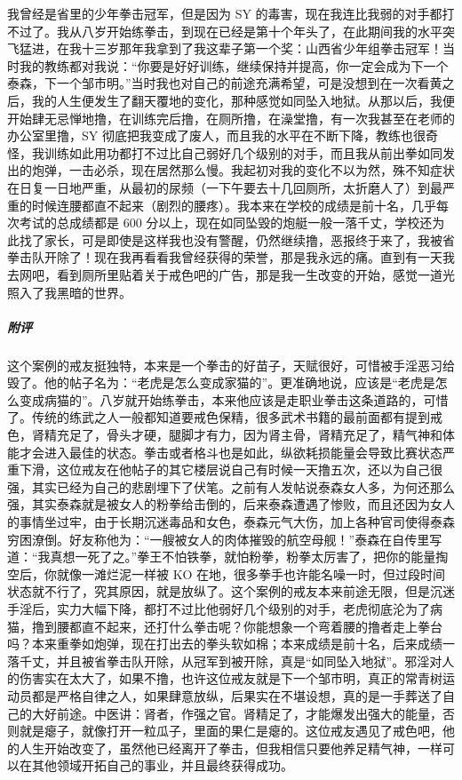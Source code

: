 \begin{case}
    我曾经是省里的少年拳击冠军，但是因为 SY 的毒害，现在我连比我弱的对手都打不过了。我从八岁开始练拳击，到现在已经是第十个年头了，在此期间我的水平突飞猛进，在我十三岁那年我拿到了我这辈子第一个奖：山西省少年组拳击冠军！当时我的教练都对我说：“你要是好好训练，继续保持并提高，你一定会成为下一个泰森，下一个邹市明。”当时我也对自己的前途充满希望，可是没想到在一次看黄之后，我的人生便发生了翻天覆地的变化，那种感觉如同坠入地狱。从那以后，我便开始肆无忌惮地撸，在训练完后撸，在厕所撸，在澡堂撸，有一次我甚至在老师的办公室里撸，SY 彻底把我变成了废人，而且我的水平在不断下降，教练也很奇怪，我训练如此用功都打不过比自己弱好几个级别的对手，而且我从前出拳如同发出的炮弹，一击必杀，现在居然那么慢。我起初对我的变化不以为然，殊不知症状在日复一日地严重，从最初的尿频（一下午要去十几回厕所，太折磨人了）到最严重的时候连腰都直不起来（剧烈的腰疼）。我本来在学校的成绩是前十名，几乎每次考试的总成绩都是 600 分以上，现在如同坠毁的炮艇一般一落千丈，学校还为此找了家长，可是即使是这样我也没有警醒，仍然继续撸，恶报终于来了，我被省拳击队开除了！现在我再看看我曾经获得的荣誉，那是我永远的痛。直到有一天我去网吧，看到厕所里贴着关于戒色吧的广告，那是我一生改变的开始，感觉一道光照入了我黑暗的世界。
    \subparagraph{附评} 这个案例的戒友挺独特，本来是一个拳击的好苗子，天赋很好，可惜被手淫恶习给毁了。他的帖子名为：“老虎是怎么变成家猫的”。更准确地说，应该是“老虎是怎么变成病猫的”。八岁就开始练拳击，本来他应该是走职业拳击这条道路的，可惜了。传统的练武之人一般都知道要戒色保精，很多武术书籍的最前面都有提到戒色，肾精充足了，骨头才硬，腿脚才有力，因为肾主骨，肾精充足了，精气神和体能才会进入最佳的状态。拳击或者格斗也是如此，纵欲耗损能量会导致比赛状态严重下滑，这位戒友在他帖子的其它楼层说自己有时候一天撸五次，还以为自己很强，其实已经为自己的悲剧埋下了伏笔。之前有人发帖说泰森女人多，为何还那么强，其实泰森就是被女人的粉拳给击倒的，后来泰森遭遇了惨败，而且还因为女人的事情坐过牢，由于长期沉迷毒品和女色，泰森元气大伤，加上各种官司使得泰森穷困潦倒。好友称他为：“一艘被女人的肉体摧毁的航空母舰！”泰森在自传里写道：“我真想一死了之。”拳王不怕铁拳，就怕粉拳，粉拳太厉害了，把你的能量掏空后，你就像一滩烂泥一样被 KO 在地，很多拳手也许能名噪一时，但过段时间状态就不行了，究其原因，就是放纵了。这个案例的戒友本来前途无限，但是沉迷手淫后，实力大幅下降，都打不过比他弱好几个级别的对手，老虎彻底沦为了病猫，撸到腰都直不起来，还打什么拳击呢？你能想象一个弯着腰的撸者走上拳台吗？本来重拳如炮弹，现在打出去的拳头软如棉；本来成绩是前十名，后来成绩一落千丈，并且被省拳击队开除，从冠军到被开除，真是“如同坠入地狱”。邪淫对人的伤害实在太大了，如果不撸，也许这位戒友就是下一个邹市明，真正的常青树运动员都是严格自律之人，如果肆意放纵，后果实在不堪设想，真的是一手葬送了自己的大好前途。中医讲：肾者，作强之官。肾精足了，才能爆发出强大的能量，否则就是瘪子，就像打开一粒瓜子，里面的果仁是瘪的。这位戒友遇见了戒色吧，他的人生开始改变了，虽然他已经离开了拳击，但我相信只要他养足精气神，一样可以在其他领域开拓自己的事业，并且最终获得成功。
\end{case}

